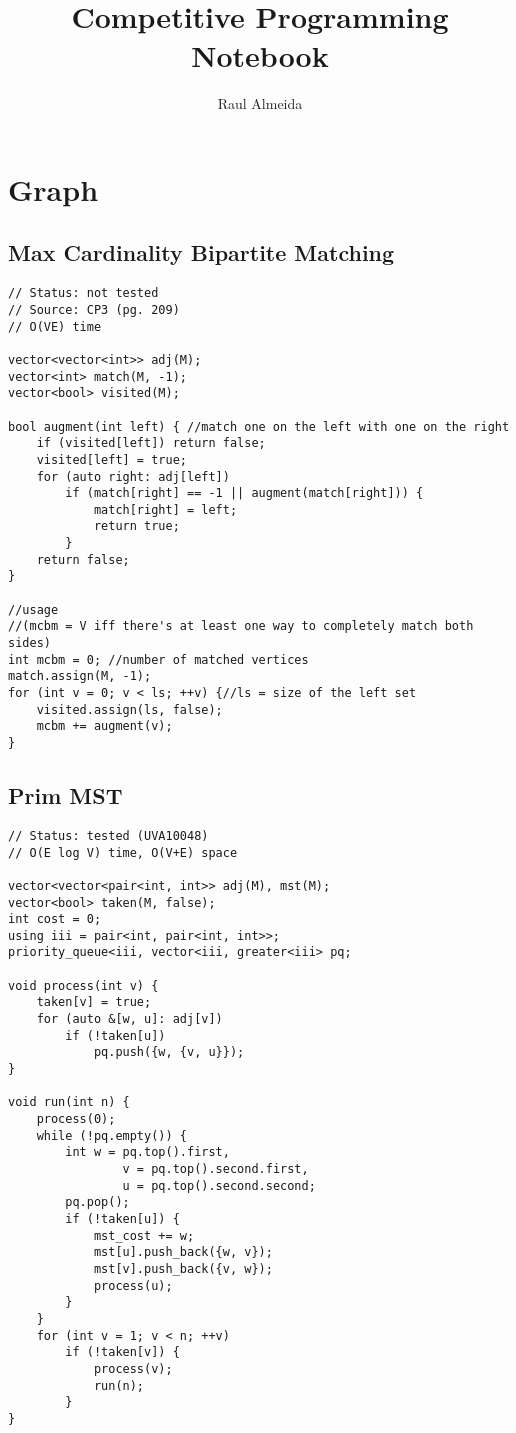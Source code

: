 \documentclass[12pt, a4paper, twoside]{article}
\title{Competitive Programming Notebook}
\author{Raul Almeida}
\begin{document}
\twocolumn
\date{}
\maketitle

\tableofcontents


\section{Graph}

\subsection{Max Cardinality Bipartite Matching}
\begin{lstlisting}
// Status: not tested
// Source: CP3 (pg. 209)
// O(VE) time

vector<vector<int>> adj(M);
vector<int> match(M, -1);
vector<bool> visited(M);

bool augment(int left) { //match one on the left with one on the right
	if (visited[left]) return false;
	visited[left] = true;
	for (auto right: adj[left])
		if (match[right] == -1 || augment(match[right])) {
			match[right] = left;
			return true;
		}
	return false;
}

//usage
//(mcbm = V iff there's at least one way to completely match both sides)
int mcbm = 0; //number of matched vertices
match.assign(M, -1);
for (int v = 0; v < ls; ++v) {//ls = size of the left set
	visited.assign(ls, false);
	mcbm += augment(v);
}
\end{lstlisting}

\subsection{Prim MST}
\begin{lstlisting}
// Status: tested (UVA10048)
// O(E log V) time, O(V+E) space

vector<vector<pair<int, int>> adj(M), mst(M);
vector<bool> taken(M, false);
int cost = 0;
using iii = pair<int, pair<int, int>>;
priority_queue<iii, vector<iii, greater<iii> pq;

void process(int v) {
	taken[v] = true;
	for (auto &[w, u]: adj[v])
		if (!taken[u])
			pq.push({w, {v, u}});
}

void run(int n) {
	process(0);
	while (!pq.empty()) {
		int w = pq.top().first,
				v = pq.top().second.first,
				u = pq.top().second.second;
		pq.pop();
		if (!taken[u]) {
			mst_cost += w;
			mst[u].push_back({w, v});
			mst[v].push_back({v, w});
			process(u);
		}
	}
	for (int v = 1; v < n; ++v)
		if (!taken[v]) {
			process(v);
			run(n);
		}
}
\end{lstlisting}
\end{document}
